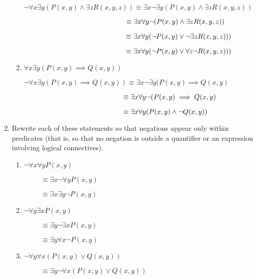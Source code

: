 \documentclass[11pt]{article}
\begin{document}
\begin{enumerate}[label=\textbf{\arabic*.}]
\begin{enumerate}[label=\textbf{\alph*)}]
		$\neg\forall x\exists y(P(x, y) \land \exists zR(x, y, z)) \equiv \exists x\neg \exists y(P(x, y) \land \exists zR(x, y, z))$
		
		$\hspace{5.1cm}\equiv \exists x\forall y\neg(P(x, y) \land \exists zR(x, y, z))$
		
		$\hspace{5.1cm}\equiv \exists x\forall y(\neg P(x, y) \lor \neg\exists zR(x, y, z)))$
		
		$\hspace{5.1cm}\equiv \exists x\forall y(\neg P(x, y) \lor \forall z\neg R(x, y, z)))$
		
		\item $\forall x\exists y(P(x, y) \implies Q(x, y))$
		
		$\neg\forall x\exists y(P(x, y) \implies Q(x, y)) \equiv \exists x\neg\exists y(P(x, y) \implies Q(x, y)$
		
		$\hspace{4.95cm}\equiv  \exists x\forall y\neg(P(x, y) \implies Q(x, y)$
		
		$\hspace{4.95cm}\equiv \exists x\forall y(P(x, y) \land \neg Q(x, y))$
	\end{enumerate}

	\item Rewrite each of these statements so that negations appear only within predicates (that is, so that no negation is outside a quantifier or an expression involving logical connectives).
	\begin{enumerate}[label=\textbf{\alph*)}]
		\item $\neg\forall x\forall yP(x, y)$
		
		$\hspace{1cm}\equiv \exists x\neg\forall yP(x, y)$
		
		$\hspace{1cm}\equiv \exists x\exists y\neg P(x, y)$
		
		\item $\neg\forall y\exists xP(x, y)$
		
		$\hspace{1cm}\equiv \exists y\neg\exists xP(x, y)$
		
		$\hspace{1cm}\equiv \exists y\forall x\neg P(x, y)$
		
		\item $\neg\forall y\forall x(P(x, y) \lor Q(x, y))$
		
		$\hspace{1cm}\equiv \exists y\neg\forall x(P(x, y) \lor Q(x, y))$
		

\end{enumerate}
\end{enumerate}
\end{document}
